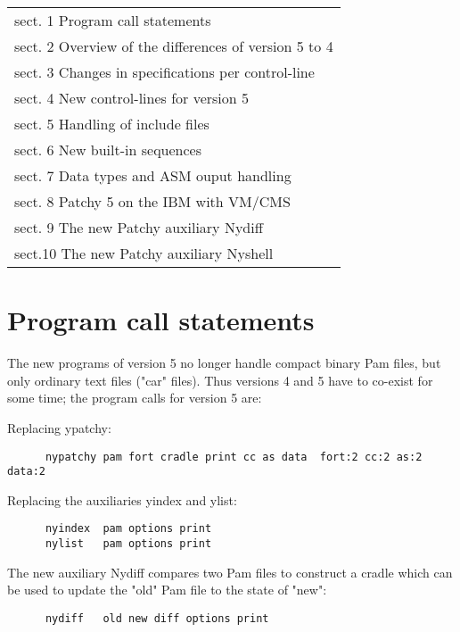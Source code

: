 \begin{tabular}{@{\hspace{2cm}}l}
    sect. 1  Program call statements                      \\
    sect. 2  Overview of the differences of version 5 to 4\\
    sect. 3  Changes in specifications per control-line   \\
    sect. 4  New control-lines for version 5              \\
    sect. 5  Handling of include files                    \\
    sect. 6  New built-in sequences                       \\
    sect. 7  Data types and ASM ouput handling            \\
    sect. 8  Patchy 5 on the IBM with VM/CMS              \\
    sect. 9  The new Patchy auxiliary Nydiff              \\
    sect.10  The new Patchy auxiliary Nyshell
\end{tabular}


\section{Program call statements}

The new programs of version 5 no longer handle compact binary Pam files,
but only ordinary text files ("car" files). Thus versions 4 and 5 have
to co-exist for some time; the program calls for version 5 are:

Replacing ypatchy:

\begin{verbatim}
      nypatchy pam fort cradle print cc as data  fort:2 cc:2 as:2 data:2
\end{verbatim}

Replacing the auxiliaries yindex and ylist:

\begin{verbatim}
      nyindex  pam options print
      nylist   pam options print
\end{verbatim}

The new auxiliary Nydiff compares two Pam files to construct a cradle
which can be used to update the "old" Pam file to the state of "new":

\begin{verbatim}
      nydiff   old new diff options print
\end{verbatim}

